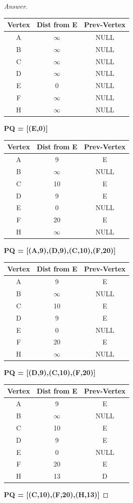 \documentclass[11pt]{article}
\theoremstyle{definition}
\theoremstyle{definition}
\theoremstyle{definition}
\begin{document}
\begin{proof}[Answer]

\begin{center}
\begin{tabular}[c]{|c|c|c|} 
	Vertex &Dist from E &Prev-Vertex \\\hline
	A &$\infty$ & NULL\\
	B &$\infty$ & NULL\\
	C &$\infty$& NULL\\
	D &$\infty$ & NULL\\
	E & 0& NULL\\
	F &$\infty$ & NULL\\
	H &$\infty$ & NULL\\
\end{tabular}
\end{center}	
\textbf{PQ = [(E,0)]}

\begin{center}
\begin{tabular}[c]{|c|c|c|} 
	Vertex &Dist from E &Prev-Vertex \\\hline
	A & 9  & E\\
	B &$\infty$ & NULL\\
	C & 10 & E\\
	D &9 & E\\
	E & 0& NULL\\
	F &20 & E\\
	H &$\infty$ & NULL\\
\end{tabular}

\end{center}	
\textbf{PQ = [(A,9),(D,9),(C,10),(F,20)]}
\begin{center}
\begin{tabular}[c]{|c|c|c|} 
	Vertex &Dist from E &Prev-Vertex \\\hline
	A & 9  & E\\
	B &$\infty$ & NULL\\
	C & 10 & E\\
	D &9 & E\\
	E & 0& NULL\\
	F &20 & E\\
	H &$\infty$ & NULL\\
\end{tabular}
\end{center}	
\textbf{PQ = [(D,9),(C,10),(F,20)]}

\begin{center}
\begin{tabular}[c]{|c|c|c|} 
	Vertex &Dist from E &Prev-Vertex \\\hline
	A & 9  & E\\
	B &$\infty$ & NULL\\
	C & 10 & E\\
	D &9 & E\\
	E & 0& NULL\\
	F &20 & E\\
	H &13 & D\\
\end{tabular}
\end{center}	
\textbf{PQ = [(C,10),(F,20),(H,13)]}


\end{proof}
\end{document}

